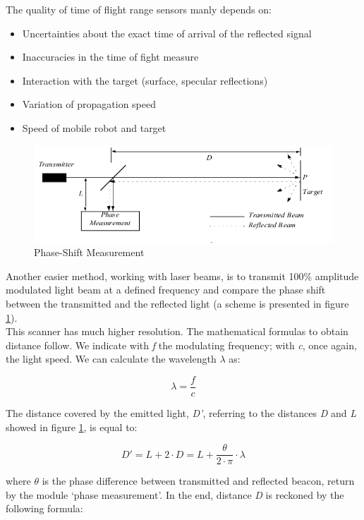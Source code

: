 The quality of time of flight range sensors manly depends on:

\begin{itemize}
\item Uncertainties about the exact time of arrival of the reflected signal
\item Inaccuracies in the time of fight measure
\item Interaction with the target (surface, specular reflections)
\item Variation of propagation speed
\item Speed of mobile robot and target
\end{itemize}

\begin{figure} [h]
  \begin{center}
    \includegraphics[width=\textwidth]{img/laser_shift_phase.png}
    \caption{Phase-Shift Measurement}
    \label{fig:laser_shift_phase}
  \end{center}
\end{figure}
Another easier method, working with laser beams, is to transmit 100\%
amplitude modulated light beam at a defined frequency and compare
the phase shift between the transmitted and the reflected light (a scheme
is presented in figure \ref{fig:laser_shift_phase}).
\\
This scanner has much higher resolution. The mathematical formulas to
obtain distance follow. We indicate with \textit{f} the modulating
frequency; with \textit{c}, once again, the light speed. We can calculate
the wavelength \textit{$\lambda$} as:

\[
\lambda = \frac{f}{c}
\]

The distance covered by the emitted light, \textit{D'}, referring to
the distances \textit{D} and \textit{L} showed in figure
\ref{fig:laser_shift_phase}, is equal to:

\[
D' = L + 2 \cdot D = L + \frac{\theta}{2\cdot\pi}\cdot\lambda
\]

where \textit{$\theta$} is the phase difference between transmitted
and reflected beacon, return by the module `phase measurement'.
In the end, distance \textit{D} is reckoned by the following formula:

